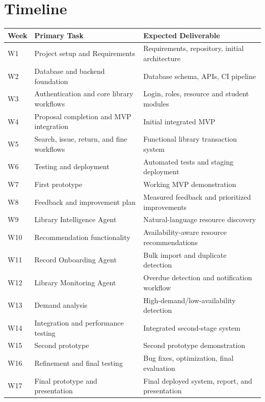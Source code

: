 \documentclass[11pt,a4paper]{article}
\begin{document}
\section{Timeline}
\begin{table}[H]
\centering
\begin{tabular}{|l|p{5cm}|p{7cm}|}
\hline
\textbf{Week} & \textbf{Primary Task} & \textbf{Expected Deliverable} \\ \hline
W1 & Project setup and Requirements & Requirements, repository, initial architecture \\ \hline
W2 & Database and backend foundation & Database schema, APIs, CI pipeline \\ \hline
W3 & Authentication and core library workflows & Login, roles, resource and student modules \\ \hline
W4 & Proposal completion and MVP integration & Initial integrated MVP \\ \hline
W5 & Search, issue, return, and fine workflows & Functional library transaction system \\ \hline
W6 & Testing and deployment & Automated tests and staging deployment \\ \hline
W7 & First prototype & Working MVP demonstration \\ \hline
W8 & Feedback and improvement plan & Measured feedback and prioritized improvements \\ \hline
W9 & Library Intelligence Agent & Natural-language resource discovery \\ \hline
W10 & Recommendation functionality & Availability-aware resource recommendations \\ \hline
W11 & Record Onboarding Agent & Bulk import and duplicate detection \\ \hline
W12 & Library Monitoring Agent & Overdue detection and notification workflow \\ \hline
W13 & Demand analysis & High-demand/low-availability detection \\ \hline
W14 & Integration and performance testing & Integrated second-stage system \\ \hline
W15 & Second prototype & Second prototype demonstration \\ \hline
W16 & Refinement and final testing & Bug fixes, optimization, final evaluation \\ \hline
W17 & Final prototype and presentation & Final deployed system, report, and presentation \\ \hline
\end{tabular}
\end{table}
\end{document}
